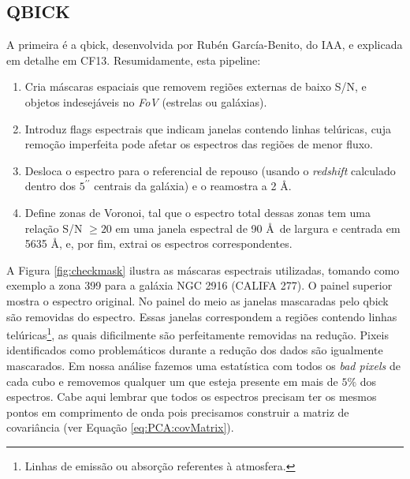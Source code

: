 \subsection{QBICK}

A primeira é a {\sc qbick}, desenvolvida por Rubén García-Benito, do IAA, e explicada em detalhe em CF13. Resumidamente,
esta pipeline:

\begin{enumerate}
\item Cria máscaras espaciais que removem regiões externas de baixo S/N, e objetos indesejáveis no {\em FoV} (estrelas
ou galáxias).
\item Introduz flags espectrais que indicam janelas contendo linhas telúricas, cuja remoção imperfeita pode afetar os
espectros das regiões de menor fluxo.
\item Desloca o espectro para o referencial de repouso (usando o {\em redshift} calculado dentro dos $5^{\prime\prime}$
centrais da galáxia) e o reamostra a 2 \AA.
\item Define zonas de Voronoi, tal que o espectro total dessas zonas tem uma relação S/N $\ge 20$ em uma janela
espectral de 90 \AA\ de largura e centrada em 5635 \AA, e, por fim, extrai os espectros correspondentes.
\end{enumerate}

A Figura \ref{fig:checkmask} ilustra as máscaras espectrais utilizadas, tomando como exemplo a zona 399 para a galáxia
NGC 2916 (CALIFA 277). O painel superior mostra o espectro original. No painel do meio as janelas mascaradas pelo {\sc
qbick} são removidas do espectro. Essas janelas correspondem a regiões contendo linhas telúricas\footnote{Linhas de
emissão ou absorção referentes à atmosfera.}, as quais dificilmente são perfeitamente removidas na redução. Pixeis
identificados como problemáticos durante a redução dos dados são igualmente mascarados. Em nossa análise fazemos uma
estatística com todos os {\em bad pixels} de cada cubo e removemos qualquer um que esteja presente em mais de $5\%$ dos
espectros. Cabe aqui lembrar que todos os espectros precisam ter os mesmos pontos em comprimento de onda pois precisamos
construir a matriz de covariância (ver Equação \ref{eq:PCA:covMatrix}).
                                                                                                                                                                                                                                                                               
